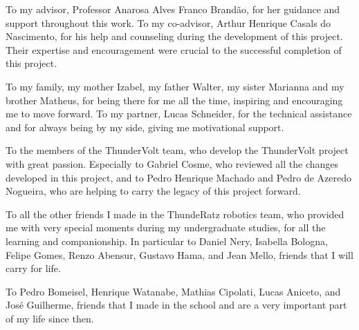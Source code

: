 \begin{agradecimentos}
    To my advisor, Professor Anarosa Alves Franco Brandão, for her guidance and support throughout this work. To my co-advisor, Arthur Henrique Casals do Nascimento, for his help and counseling during the development of this project. Their expertise and encouragement were crucial to the successful completion of this project.

    To my family, my mother Izabel, my father Walter, my sister Marianna and my brother Matheus, for being there for me all the time, inspiring and encouraging me to move forward. To my partner, Lucas Schneider, for the technical assistance and for always being by my side, giving me motivational support.

    To the members of the ThunderVolt team, who develop the ThunderVolt project with great passion. Especially to Gabriel Cosme, who reviewed all the changes developed in this project, and to Pedro Henrique Machado and Pedro de Azeredo Nogueira, who are helping to carry the legacy of this project forward.

    To all the other friends I made in the ThundeRatz robotics team, who provided me with very special moments during my undergraduate studies, for all the learning and companionship. In particular to Daniel Nery, Isabella Bologna, Felipe Gomes, Renzo Abensur, Gustavo Hama, and Jean Mello, friends that I will carry for life.

    To Pedro Bomeisel, Henrique Watanabe, Mathias Cipolati, Lucas Aniceto, and José Guilherme, friends that I made in the school and are a very important part of my life since then.
\end{agradecimentos}
